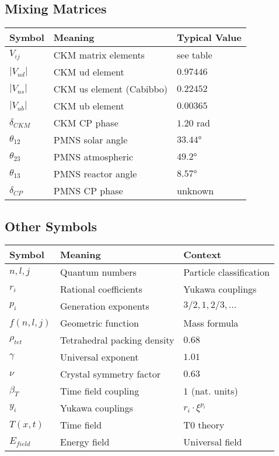 \documentclass[12pt,a4paper]{article}
\begin{document}
\subsection{Mixing Matrices}
\begin{longtable}{lll}
	\toprule
	\textbf{Symbol} & \textbf{Meaning} & \textbf{Typical Value} \\
	\midrule
	$V_{ij}$ & CKM matrix elements & see table \\
	$|V_{ud}|$ & CKM ud element & $0.97446$ \\
	$|V_{us}|$ & CKM us element (Cabibbo) & $0.22452$ \\
	$|V_{ub}|$ & CKM ub element & $0.00365$ \\
	$\delta_{CKM}$ & CKM CP phase & $1.20$ rad \\
	$\theta_{12}$ & PMNS solar angle & $33.44°$ \\
	$\theta_{23}$ & PMNS atmospheric & $49.2°$ \\
	$\theta_{13}$ & PMNS reactor angle & $8.57°$ \\
	$\delta_{CP}$ & PMNS CP phase & unknown \\
	\bottomrule
\end{longtable}

\subsection{Other Symbols}
\begin{longtable}{lll}
	\toprule
	\textbf{Symbol} & \textbf{Meaning} & \textbf{Context} \\
	\midrule
	$n, l, j$ & Quantum numbers & Particle classification \\
	$r_i$ & Rational coefficients & Yukawa couplings \\
	$p_i$ & Generation exponents & $3/2, 1, 2/3, ...$ \\
	$f(n,l,j)$ & Geometric function & Mass formula \\
	$\rho_{tet}$ & Tetrahedral packing density & $0.68$ \\
	$\gamma$ & Universal exponent & $1.01$ \\
	$\nu$ & Crystal symmetry factor & $0.63$ \\
	$\beta_T$ & Time field coupling & $1$ (nat. units) \\
	$y_i$ & Yukawa couplings & $r_i \cdot \xi^{p_i}$ \\
	$T(x,t)$ & Time field & T0 theory \\
	$E_{field}$ & Energy field & Universal field \\
	\bottomrule
\end{longtable}	
\end{document}
